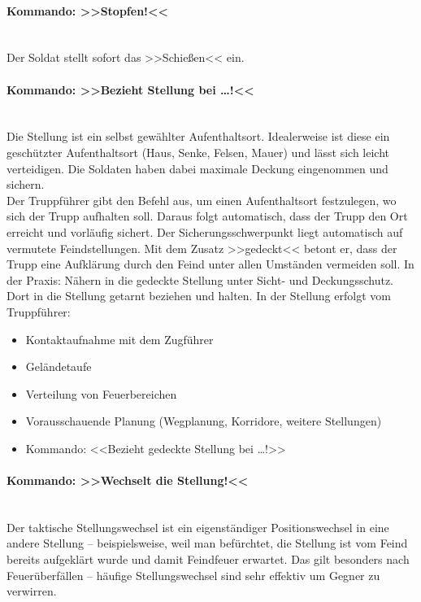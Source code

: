 \paragraph*{Kommando: >>Stopfen!<<}\hfil\\
	Der Soldat stellt sofort das >>Schießen<< ein.

\paragraph*{Kommando: >>Bezieht Stellung bei \dots!<<}\hfil\\
	Die Stellung ist ein selbst gewählter Aufenthaltsort. Idealerweise ist diese ein geschützter Aufenthaltsort (Haus, Senke, Felsen, Mauer) und lässt sich leicht verteidigen. Die Soldaten haben dabei maximale Deckung eingenommen und sichern.\\
	Der Truppführer gibt den Befehl aus, um einen Aufenthaltsort festzulegen, wo sich der Trupp aufhalten soll. Daraus folgt automatisch, dass der Trupp den Ort erreicht und vorläufig sichert. Der Sicherungsschwerpunkt liegt automatisch auf vermutete Feindstellungen. Mit dem Zusatz >>gedeckt<< betont er, dass der Trupp eine Aufklärung durch den Feind unter allen Umständen vermeiden soll. In der Praxis: Nähern in die gedeckte Stellung unter Sicht- und Deckungsschutz. Dort in die Stellung getarnt beziehen und halten. In der Stellung erfolgt vom Truppführer:
		\begin{itemize}
			\item Kontaktaufnahme mit dem Zugführer 
			\item Geländetaufe 
			\item Verteilung von Feuerbereichen 
			\item Vorausschauende Planung (Wegplanung, Korridore, weitere Stellungen) 
			\item Kommando: <<Bezieht gedeckte Stellung bei \dots!>> 
		\end{itemize}

\paragraph*{Kommando: >>Wechselt die Stellung!<<}\hfil\\
	Der taktische Stellungswechsel ist ein eigenständiger Positionswechsel in eine andere Stellung – beispielsweise, weil man befürchtet, die Stellung ist vom Feind bereits aufgeklärt wurde und damit Feindfeuer erwartet. Das gilt besonders nach Feuerüberfällen – häufige Stellungswechsel sind sehr effektiv um Gegner zu verwirren.

